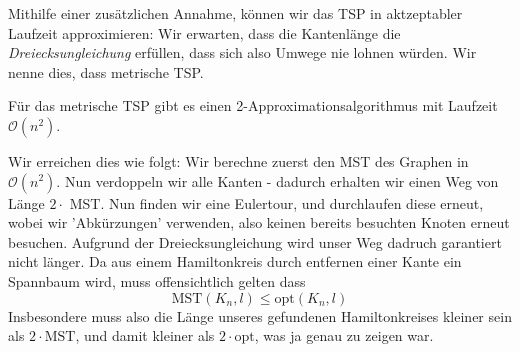 Mithilfe einer zusätzlichen Annahme, können wir das TSP in aktzeptabler Laufzeit approximieren: Wir erwarten,
dass die Kantenlänge die \textit{Dreiecksungleichung} erfüllen, dass sich also Umwege nie lohnen würden. Wir
nenne dies, dass metrische TSP.

\begin{satz}[Satz]
    Für das metrische TSP gibt es einen 2-Approximationsalgorithmus mit Laufzeit $\mathcal{O}(n^2)$.
\end{satz}
\bigskip

Wir erreichen dies wie folgt: Wir berechne zuerst den MST des Graphen in $\mathcal{O}(n^2)$. Nun verdoppeln wir
alle Kanten - dadurch erhalten wir einen Weg von Länge $2 \cdot$ MST. Nun finden wir eine Eulertour, und durchlaufen
diese erneut, wobei wir 'Abkürzungen' verwenden, also keinen bereits besuchten Knoten erneut besuchen. Aufgrund der
Dreiecksungleichung wird unser Weg dadruch garantiert nicht länger. Da aus einem Hamiltonkreis durch entfernen einer
Kante ein Spannbaum wird, muss offensichtlich gelten dass
$$\text{MST}(K_n,l) \leq \text{opt}(K_n,l)$$
Insbesondere muss also die Länge unseres gefundenen Hamiltonkreises kleiner sein als $2 \cdot \text{MST}$, und damit kleiner
als $2 \cdot \text{opt}$, was ja genau zu zeigen war.